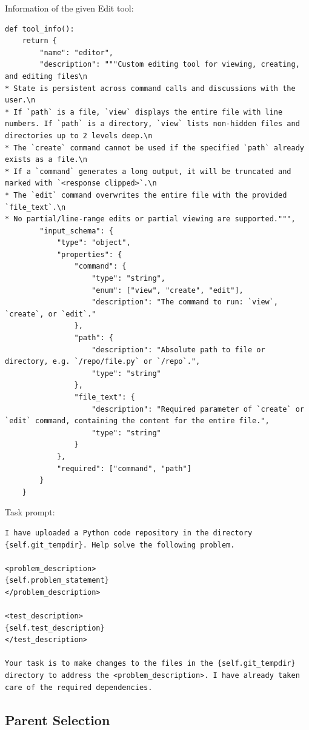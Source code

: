 \documentclass{article}
\begin{document}
Information of the given Edit tool:

\begin{lstlisting}
def tool_info():
    return {
        "name": "editor",
        "description": """Custom editing tool for viewing, creating, and editing files\n
* State is persistent across command calls and discussions with the user.\n
* If `path` is a file, `view` displays the entire file with line numbers. If `path` is a directory, `view` lists non-hidden files and directories up to 2 levels deep.\n
* The `create` command cannot be used if the specified `path` already exists as a file.\n
* If a `command` generates a long output, it will be truncated and marked with `<response clipped>`.\n
* The `edit` command overwrites the entire file with the provided `file_text`.\n
* No partial/line-range edits or partial viewing are supported.""",
        "input_schema": {
            "type": "object",
            "properties": {
                "command": {
                    "type": "string",
                    "enum": ["view", "create", "edit"],
                    "description": "The command to run: `view`, `create`, or `edit`."
                },
                "path": {
                    "description": "Absolute path to file or directory, e.g. `/repo/file.py` or `/repo`.",
                    "type": "string"
                },
                "file_text": {
                    "description": "Required parameter of `create` or `edit` command, containing the content for the entire file.",
                    "type": "string"
                }
            },
            "required": ["command", "path"]
        }
    }
\end{lstlisting}


Task prompt:

\begin{lstlisting}
I have uploaded a Python code repository in the directory {self.git_tempdir}. Help solve the following problem.

<problem_description>
{self.problem_statement}
</problem_description>

<test_description>
{self.test_description}
</test_description>

Your task is to make changes to the files in the {self.git_tempdir} directory to address the <problem_description>. I have already taken care of the required dependencies.
\end{lstlisting}


\subsection{Parent Selection}
\label{app:parent-select}
\end{document}
